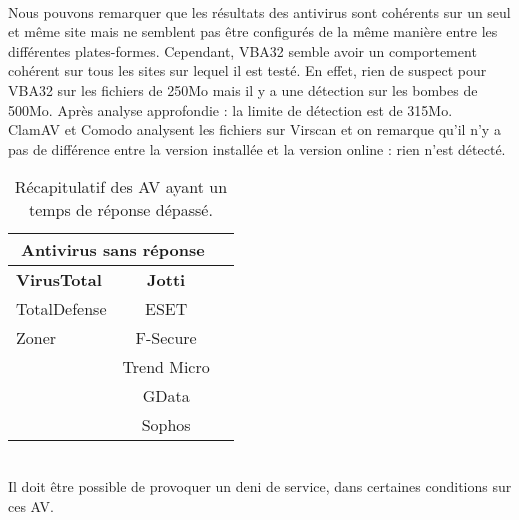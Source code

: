 \documentclass{svjour3}
\begin{document}
\\Nous pouvons remarquer que les résultats des antivirus sont cohérents sur un seul et même site mais ne semblent pas être configurés de la même manière entre les différentes plates-formes. Cependant, VBA32 semble avoir un comportement cohérent sur tous les sites sur lequel il est testé. En effet, rien de suspect pour VBA32 sur les fichiers de 250Mo mais il y a une détection sur les bombes de 500Mo. Après analyse approfondie : la limite de détection est de 315Mo.\\
ClamAV et Comodo analysent les fichiers sur Virscan et on remarque qu'il n'y a pas de différence entre la version installée et la version online : rien n'est détecté.\\
\begin{table}[ht!]
\begin{normalsize}
\begin{center}
\begin{tabular}{|l|c|c|}
    \hline
	\multicolumn{2}{|c|}{\textbf{Antivirus sans réponse}} \\
    \hline
    \textbf{VirusTotal} & \textbf{Jotti} \\
     \hline
    TotalDefense & ESET\\
    \hline
    Zoner & F-Secure\\
    \hline
     & Trend Micro\\
    \hline
     & GData\\
    \hline
     & Sophos\\
    \hline
\end{tabular}
\end{center}
\end{normalsize}
\caption{Récapitulatif des AV ayant un temps de réponse dépassé.}
\end{table}
\\
Il doit être possible de provoquer un deni de service, dans certaines conditions sur ces AV.
\end{document}
